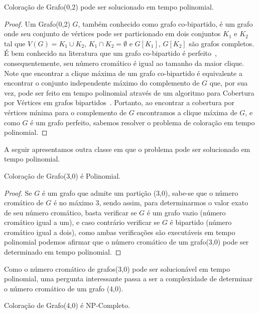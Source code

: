 	\begin{teorema}
		Coloração de Grafo(0,2) pode ser solucionado em tempo polinomial.
	\end{teorema}
	\begin{proof}
		Um Grafo(0,2) $G$, também conhecido como grafo co-bipartido, é um grafo onde seu conjunto de vértices pode ser particionado em dois conjuntos $K_1$ e $K_2$ tal que $V(G)=K_1\cup K_2$, $K_1\cap K_2=\emptyset$ e $G[K_1]$, $G[K_2]$ são grafos completos.
É bem conhecido na literatura que um grafo co-bipartido é perfeito~\cite{bollo98}, consequentemente, seu número cromático é igual ao tamanho da maior clique. Note que encontrar a clique máxima de um grafo co-bipartido é equivalente a encontrar o conjunto independente máximo do complemento de $G$ que, por sua vez, pode ser feito em tempo polinomial através de um algoritmo para Cobertura por Vértices em grafos bipartidos~\cite{konig31,zing12}. Portanto, ao encontrar a cobertura por vértices mínima para o complemento de $G$ encontramos a clique máxima de $G$, e como $G$ é um grafo perfeito, sabemos resolver o problema de coloração em tempo polinomial.
	\end{proof}

A seguir apresentamos outra classe em que o problema pode ser solucionado em tempo polinomial.

\begin{teorema}
Coloração de Grafo(3,0) é Polinomial.
\end{teorema}

\begin{proof}
Se $G$ é um grafo que admite um partição (3,0), sabe-se que o número cromático de $G$ é no máximo 3, sendo assim, para determinarmos o valor exato de seu número cromático, basta verificar se $G$ é um grafo vazio (número cromático igual a um), e caso contrário verificar se $G$ é bipartido (número cromático igual a dois), como ambas verificações são executáveis em tempo polinomial podemos afirmar que o número cromático de um grafo(3,0) pode ser determinado em tempo polinomial.
	\end{proof}

Como o número cromático de grafos(3,0) pode ser solucionável em tempo polinomial, uma pergunta interessante passa a ser a complexidade de determinar o número cromático de um grafo (4,0).


\begin{teorema}
	Coloração de Grafo(4,0) é NP-Completo.
\end{teorema}

